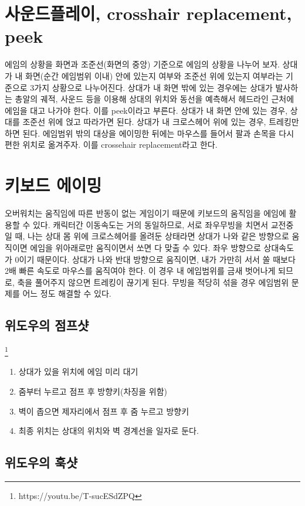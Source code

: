 \section{사운드플레이, crosshair replacement, peek}
에임의 상황을 화면과 조준선(화면의 중앙) 기준으로 에임의 상황을 나누어 보자. 상대가 내 화면(순간 에임범위 이내) 안에 있는지 여부와 조준선 위에 있는지 여부라는 기준으로 3가지 상황으로 나누어진다. 상대가 내 화면 밖에 있는 경우에는 상대가 발사하는 총알의 궤적, 사운드 등을 이용해 상대의 위치와 동선을 예측해서 헤드라인 근처에 에임을 대고 나가야 한다. 이를 peek이라고 부른다.
상대가  내 화면 안에 있는 경우, 상대를 조준선 위에 얹고 따라가면 된다. 상대가 내 크로스헤어 위에 있는 경우, 트레킹만 하면 된다.
에임범위 밖의 대상을 에이밍한 뒤에는 마우스를 들어서 팔과 손목을 다시 편한 위치로 옮겨주자. 이를 crossehair replacement라고 한다.

\section{키보드 에이밍}
오버워치는 움직임에 따른 반동이 없는 게임이기 때문에 키보드의 움직임을 에임에 활용할 수 있다.  캐릭터간 이동속도는 거의 동일하므로, 서로 좌우무빙을 치면서 교전중일 때, 나는 상대 몸 위에 크로스헤어를 올려둔 상태라면 상대가 나와 같은 방향으로 움직이면 에임을 위아래로만 움직이면서 쏘면 다 맞출 수 있다. 좌우 방향으로 상대속도가 0이기 때문이다. 상대가 나와 반대 방향으로 움직이면, 내가 가만히 서서 쏠 때보다 2배 빠른 속도로 마우스를 움직여야 한다. 이 경우 내 에임범위를 금새 벗어나게 되므로, 축을 풀어주지 않으면 트레킹이 끊기게 된다. 무빙을 적당히 섞을 경우 에임범위 문제를 어느 정도 해결할 수 있다. 
\subsection{위도우의 점프샷}
\footnote{https://youtu.be/T-sucESdZPQ}
\begin{enumerate}
    \item 상대가 있을 위치에 에임 미리 대기
    \item 줌부터 누르고 점프 후 방향키(차징을 위함)
    \item 벽이 좁으면 제자리에서 점프 후 줌 누르고 방향키
    \item 최종 위치는 상대의 위치와 벽 경계선을 일자로 둔다.
\end{enumerate}
\subsection{위도우의 훅샷}

